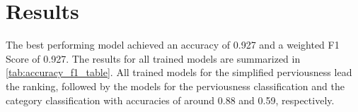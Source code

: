 


\section{Results}
\label{results}

The best performing model achieved an accuracy of 0.927 and a weighted F1 Score of 0.927.
The results for all trained models are summarized in \autoref{tab:accuracy_f1_table}.
All trained models for the simplified perviousness lead the ranking, followed by the
models for the perviousness classification and the category classification
with accuracies of around 0.88 and 0.59, respectively.

